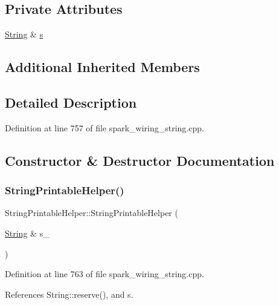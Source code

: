 \subsection*{Private Attributes}
\begin{DoxyCompactItemize}
\item 
\hyperlink{class_string}{String} \& \hyperlink{class_string_printable_helper_ac8273d5d460215114d9db27d7c7cab2e}{s}
\end{DoxyCompactItemize}
\subsection*{Additional Inherited Members}


\subsection{Detailed Description}


Definition at line 757 of file spark\+\_\+wiring\+\_\+string.\+cpp.



\subsection{Constructor \& Destructor Documentation}
\mbox{\label{class_string_printable_helper_aee189f4d6b8a240ba9c0f69674e94fc7}} 
\subsubsection{\texorpdfstring{String\+Printable\+Helper()}{StringPrintableHelper()}}
{\footnotesize\ttfamily String\+Printable\+Helper\+::\+String\+Printable\+Helper (\begin{DoxyParamCaption}\item[{\hyperlink{class_string}{String} \&}]{s\+\_\+ }\end{DoxyParamCaption})\hspace{0.3cm}{\ttfamily [inline]}}



Definition at line 763 of file spark\+\_\+wiring\+\_\+string.\+cpp.



References String\+::reserve(), and s.



